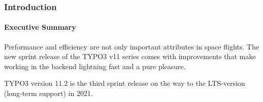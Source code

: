 %

\begin{frame}[fragile]
	\frametitle{Introduction}
	\framesubtitle{Executive Summary}

	\small
		Performance and efficiency are not only important attributes in space flights.
		The new sprint release of the TYPO3 v11 series comes with improvements that
		make working in the backend lightning fast and a pure pleasure.

		\vspace{0.2cm}

		TYPO3 version 11.2 is the third sprint release on the way to the LTS-version
		(long-term support) in 2021.

	\normalsize

\end{frame}

